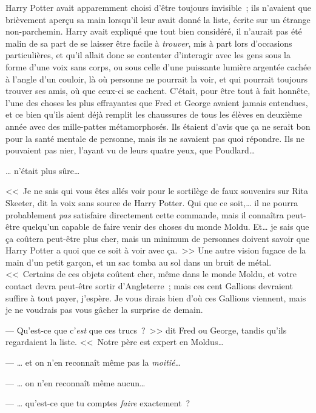 \later

Harry Potter avait apparemment choisi d'être toujours invisible~; ils n'avaient que brièvement aperçu sa main lorsqu'il leur avait donné la liste, écrite sur un étrange non-parchemin. Harry avait expliqué que tout bien considéré, il n'aurait pas été malin de sa part de se laisser être facile à \emph{trouver}, mis à part lors d'occasions particulières, et qu'il allait donc se contenter d'interagir avec les gens sous la forme d'une voix sans corps, ou sous celle d'une puissante lumière argentée cachée à l'angle d'un couloir, là où personne ne pourrait la voir, et qui pourrait toujours trouver ses amis, où que ceux-ci se cachent. C'était, pour être tout à fait honnête, l'une des choses les plus effrayantes que Fred et George avaient jamais entendues, et ce bien qu'ils aient déjà remplit les chaussures de tous les élèves en deuxième année avec des mille-pattes métamorphosés. Ils étaient d'avis que ça ne serait bon pour la santé mentale de personne, mais ils ne savaient pas quoi répondre. Ils ne pouvaient pas nier, l'ayant vu de leurs quatre yeux, que Poudlard…

… n'était plus sûre…

<<~Je ne sais qui vous êtes allés voir pour le sortilège de faux souvenirs sur Rita Skeeter, dit la voix sans source de Harry Potter. Qui que ce soit,… il ne pourra probablement \emph{pas} satisfaire directement cette commande, mais il connaîtra peut-être quelqu'un capable de faire venir des choses du monde Moldu. Et… je sais que ça coûtera peut-être plus cher, mais un minimum de personnes doivent savoir que Harry Potter a quoi que ce soit à voir avec ça.~>> Une autre vision fugace de la main d'un petit garçon, et un sac tomba au sol dans un bruit de métal. <<~Certains de ces objets coûtent cher, même dans le monde Moldu, et votre contact devra peut-être sortir d'Angleterre~; mais ces cent Gallions devraient suffire à tout payer, j'espère. Je vous dirais bien d'où ces Gallions viennent, mais je ne voudrais pas vous gâcher la surprise de demain.

--- Qu'est-ce que c'\emph{est} que ces trucs~?~>> dit Fred ou George, tandis qu'ils regardaient la liste. <<~Notre père est expert en Moldus…

--- … et on n'en reconnaît même pas la \emph{moitié}…

--- … on n'en reconnaît même aucun…

--- … qu'est-ce que tu comptes \emph{faire} exactement~?

